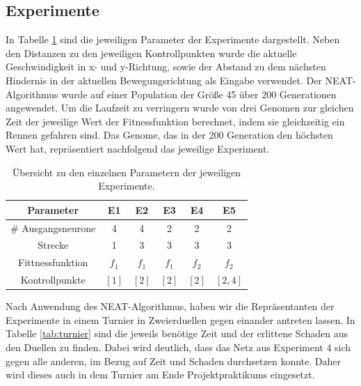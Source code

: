 \documentclass[11pt,final,journal,a4paper,towside,towcolumn]{IEEEtran}
\begin{document}
\subsection{Experimente}
In Tabelle \ref{tab:experimente} sind die jeweiligen Parameter der Experimente dargestellt. Neben den Distanzen zu den jeweiligen Kontrollpunkten wurde die aktuelle Geschwindigkeit in x- und y-Richtung, sowie der Abstand zu dem nächsten Hindernis in der aktuellen Bewegungsrichtung als Eingabe verwendet. Der \ac{NEAT}-Algorithmus wurde auf einer Population der Größe 45 über 200 Generationen angewendet. Um die Laufzeit zu verringern wurde von drei Genomen zur gleichen Zeit der jeweilige Wert der Fitnessfunktion berechnet, indem sie gleichzeitig ein Rennen gefahren sind. Das Genome, das in der 200 Generation den höchsten Wert hat, repräsentiert nachfolgend das jeweilige Experiment.

\begin{table}
	\caption{Übersicht zu den einzelnen Parametern der jeweiligen Experimente.}
	\label{tab:experimente}
	\centering
	\begin{tabular}{|c||c|c|c|c|c|}
		\hline
		Parameter & E1 & E2 & E3 & E4 & E5\\\hline\hline
		\# Ausgangsneurone & 4 & 4 & 2 & 2 & 2\\\hline
		Strecke & 1 & 3 & 3& 3 &3\\\hline
		Fittnessfunktion & $f_1$& $f_1$& $f_1$& $f_2$&$f_2$\\\hline
		Kontrollpunkte & $\left[1\right]$& $\left[2\right]$& $\left[2\right]$& $\left[2\right]$&$\left[2, 4\right]$\\\hline
	\end{tabular}
\end{table}

Nach Anwendung des \ac{NEAT}-Algorithmus, haben wir die Repräsentanten der Experimente in einem Turnier in Zweierduellen gegen einander antreten lassen. In Tabelle \ref{tab:turnier} sind die jeweils benötige Zeit und der erlittene Schaden aus den Duellen zu finden. Dabei wird deutlich, dass das Netz aus Experiment 4 sich gegen alle anderen, im Bezug auf Zeit und Schaden durchsetzen konnte. Daher wird dieses auch in dem Turnier am Ende Projektpraktikums eingesetzt.
\end{document}
